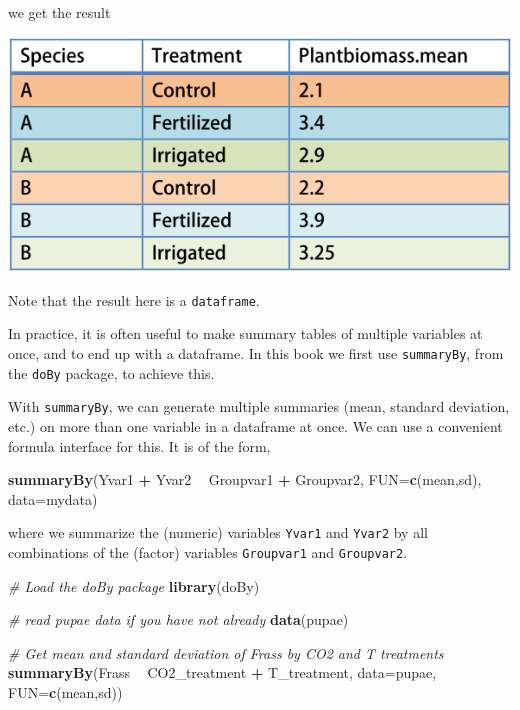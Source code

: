 \documentclass[]{book}
\newenvironment{Shaded}{\begin{snugshade}}{\end{snugshade}}
\newcommand{\CommentTok}[1]{\textcolor[rgb]{0.56,0.35,0.01}{\textit{#1}}}
\newcommand{\DataTypeTok}[1]{\textcolor[rgb]{0.13,0.29,0.53}{#1}}
\newcommand{\KeywordTok}[1]{\textcolor[rgb]{0.13,0.29,0.53}{\textbf{#1}}}
\newcommand{\NormalTok}[1]{#1}
\newcommand{\OperatorTok}[1]{\textcolor[rgb]{0.81,0.36,0.00}{\textbf{#1}}}
\newcommand{\StringTok}[1]{\textcolor[rgb]{0.31,0.60,0.02}{#1}}
\begin{document}
we get the result

\includegraphics[width=0.33\linewidth]{screenshots/summarybyresultlarger}

Note that the result here is a \texttt{dataframe}.

In practice, it is often useful to make summary tables of multiple variables at once, and to end up with a dataframe. In this book we first use \texttt{summaryBy}, from the \texttt{doBy} package, to achieve this.

With \texttt{summaryBy}, we can generate multiple summaries (mean, standard deviation, etc.) on more than one variable in a dataframe at once. We can use a convenient formula interface for this. It is of the form,

\begin{Shaded}
\begin{Highlighting}[]
\KeywordTok{summaryBy}\NormalTok{(Yvar1 }\OperatorTok{+}\StringTok{ }\NormalTok{Yvar2 }\OperatorTok{~}\StringTok{ }\NormalTok{Groupvar1 }\OperatorTok{+}\StringTok{ }\NormalTok{Groupvar2, }\DataTypeTok{FUN=}\KeywordTok{c}\NormalTok{(mean,sd), }\DataTypeTok{data=}\NormalTok{mydata)}
\end{Highlighting}
\end{Shaded}

where we summarize the (numeric) variables \texttt{Yvar1} and \texttt{Yvar2} by all combinations of the (factor) variables \texttt{Groupvar1} and \texttt{Groupvar2}.

\begin{Shaded}
\begin{Highlighting}[]
\CommentTok{# Load the doBy package}
\KeywordTok{library}\NormalTok{(doBy)}

\CommentTok{# read pupae data if you have not already}
\KeywordTok{data}\NormalTok{(pupae)}

\CommentTok{# Get mean and standard deviation of Frass by CO2 and T treatments}
\KeywordTok{summaryBy}\NormalTok{(Frass }\OperatorTok{~}\StringTok{ }\NormalTok{CO2_treatment }\OperatorTok{+}\StringTok{ }\NormalTok{T_treatment,}
          \DataTypeTok{data=}\NormalTok{pupae, }\DataTypeTok{FUN=}\KeywordTok{c}\NormalTok{(mean,sd))}
\end{Highlighting}
\end{Shaded}
\end{document}
